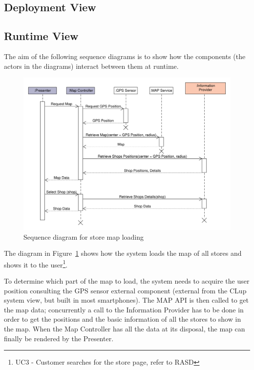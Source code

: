 \subsection{Deployment View}

\clearpage
\subsection{Runtime View}
The aim of the following sequence diagrams is to show how the components (the actors in the diagrams) interact between them at runtime.
\begin{figure}[H]
    \includegraphics[width=\textwidth]{Images/UML_user_map_sequence.pdf}
    \caption{\label{fig:UML_user_map_sequence}Sequence diagram for store map loading}
\end{figure}
The diagram in Figure~\ref{fig:UML_user_map_sequence} shows how the system loads the map of all stores and shows it to the user\footnote{UC3 - Customer searches for the store page, refer to RASD}.

To determine which part of the map to load, the system needs to acquire the user position consulting the GPS sensor external component (external from the CLup system view, but built in most smartphones). The MAP API is then called to get the map data; concurrently a call to the Information Provider has to be done in order to get the positions and the basic information of all the stores to show in the map. When the Map Controller has all the data at its disposal, the map can finally be rendered by the Presenter.

